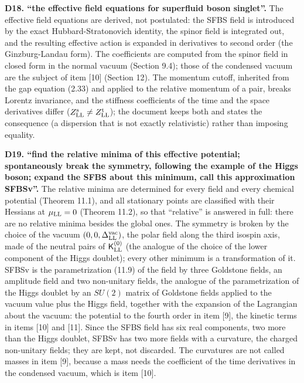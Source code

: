 \documentclass[
  10pt,
]{article}
\begin{document}
\textbf{D18. ``the effective field equations for superfluid boson
singlet''.} The effective field equations are derived, not postulated:
the SFBS field is introduced by the exact Hubbard-Stratonovich identity,
the spinor field is integrated out, and the resulting effective action
is expanded in derivatives to second order (the Ginzburg-Landau form).
The coefficients are computed from the spinor field in closed form in
the normal vacuum (Section 9.4); those of the condensed vacuum are the
subject of item {[}10{]} (Section 12). The momentum cutoff, inherited
from the gap equation (2.33) and applied to the relative momentum of a
pair, breaks Lorentz invariance, and the stiffness coefficients of the
time and the space derivatives differ
(\(Z^{\rm s}_{\rm LL}\neq Z^{\rm t}_{\rm LL}\)); the document keeps both
and states the consequence (a dispersion that is not exactly
relativistic) rather than imposing equality.

\textbf{D19. ``find the relative minima of this effective potential;
spontaneously break the symmetry, following the example of the Higgs
boson; expand the SFBS about this minimum, call this approximation
SFBSv''.} The relative minima are determined for every field and every
chemical potential (Theorem 11.1), and all stationary points are
classified with their Hessians at \(\mu_{\rm LL}=0\) (Theorem 11.2), so
that ``relative'' is answered in full: there are no relative minima
besides the global ones. The symmetry is broken by the choice of the
vacuum \((0,0,\Delta^{\rm vac}_{\rm LL})\), the polar field along the
third isospin axis, made of the neutral pairs of
\(\mathsf K^{(0)}_{\rm LL}\) (the analogue of the choice of the lower
component of the Higgs doublet); every other minimum is a transformation
of it. SFBSv is the parametrization (11.9) of the field by three
Goldstone fields, an amplitude field and two non-unitary fields, the
analogue of the parametrization of the Higgs doublet by an \(SU(2)\)
matrix of Goldstone fields applied to the vacuum value plus the Higgs
field, together with the expansion of the Lagrangian about the vacuum:
the potential to the fourth order in item {[}9{]}, the kinetic terms in
items {[}10{]} and {[}11{]}. Since the SFBS field has six real
components, two more than the Higgs doublet, SFBSv has two more fields
with a curvature, the charged non-unitary fields; they are kept, not
discarded. The curvatures are not called masses in item {[}9{]}, because
a mass needs the coefficient of the time derivatives in the condensed
vacuum, which is item {[}10{]}.
\end{document}
